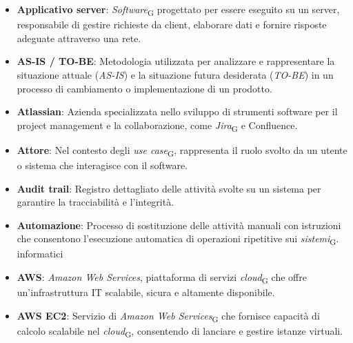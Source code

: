 \begin{itemize}
    \item \textbf{Applicativo server}: \textit{Software}\textsubscript{G} progettato per essere eseguito su un server, responsabile di gestire richieste da client, elaborare dati e fornire risposte adeguate attraverso una rete.
    \item \textbf{AS-IS / TO-BE}: Metodologia utilizzata per analizzare e rappresentare la situazione attuale (\textit{AS-IS}) e la situazione futura desiderata (\textit{TO-BE}) in un processo di cambiamento o implementazione di un prodotto.
    \item \textbf{Atlassian}: Azienda specializzata nello sviluppo di strumenti software per il project management e la collaborazione, come \textit{Jira}\textsubscript{G} e Confluence.
    \item \textbf{Attore}: Nel contesto degli \textit{use case}\textsubscript{G}, rappresenta il ruolo svolto da un utente o sistema che interagisce con il software.
    \item \textbf{Audit trail}: Registro dettagliato delle attività svolte su un sistema per garantire la tracciabilità e l’integrità.
    \item \textbf{Automazione}: Processo di sostituzione delle attività manuali con istruzioni che consentono l'esecuzione automatica di operazioni ripetitive sui \textit{sistemi}\textsubscript{G}. informatici
    \item \textbf{AWS}: \textit{Amazon Web Services}, piattaforma di servizi \textit{cloud}\textsubscript{G} che offre un'infrastruttura IT scalabile, sicura e altamente disponibile.
    \item \textbf{AWS EC2}: Servizio di \textit{Amazon Web Services}\textsubscript{G} che fornisce capacità di calcolo scalabile nel \textit{cloud}\textsubscript{G}, consentendo di lanciare e gestire istanze virtuali.
\end{itemize}
